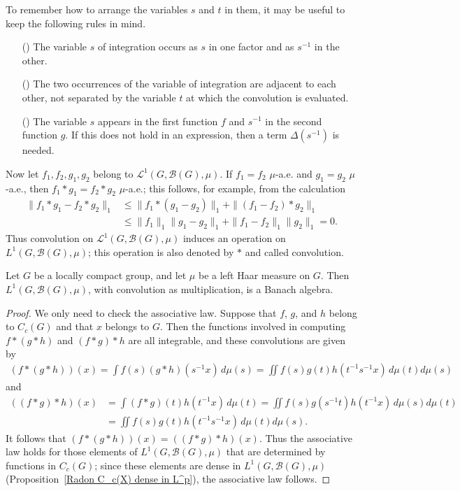 To remember how to arrange the variables $s$ and $t$ in them, it may be useful to keep the following rules in mind.
\begin{itemize}
\item[(\rmnum{1})] The variable $s$ of integration occurs as $s$ in one factor and as $s^{-1}$ in the other.
\item[(\rmnum{2})] The two occurrences of the variable of integration are adjacent to each other, not separated by the variable $t$ at which the convolution is evaluated.
\item[(\rmnum{3})] The variable $s$ appears in the first function $f$ and $s^{-1}$ in the second function $g$. If this does not hold in an expression, then a term $\Delta(s^{-1})$ is needed.
\end{itemize}
Now let $f_1,f_2,g_1,g_2$ belong to $\mathcal{L}^1(G,\mathcal{B}(G),\mu)$. If $f_1=f_2$ $\mu$-a.e. and $g_1=g_2$ $\mu$-a.e., then $f_1\ast g_1=f_2\ast g_2$ $\mu$-a.e.; this follows, for example, from the calculation
\begin{align*}
\|f_1\ast g_1-f_2\ast g_2\|_1&\leq\|f_1\ast(g_1-g_2)\|_1+\|(f_1-f_2)\ast g_2\|_1\\
&\leq\|f_1\|_1\|g_1-g_2\|_1+\|f_1-f_2\|_1\|g_2\|_1=0.
\end{align*}
Thus convolution on $\mathcal{L}^1(G,\mathcal{B}(G),\mu)$ induces an operation on $L^1(G,\mathcal{B}(G),\mu)$; this operation is also denoted by $\ast$ and called convolution.
\begin{proposition}
Let $G$ be a locally compact group, and let $\mu$ be a left Haar measure on $G$. Then $L^1(G,\mathcal{B}(G),\mu)$, with convolution as multiplication, is a Banach algebra.
\end{proposition}
\begin{proof}
We only need to check the associative law. Suppose that $f$, $g$, and $h$ belong to $C_c(G)$ and that $x$ belongs to $G$. Then the functions involved in computing $f\ast(g\ast h)$ and $(f\ast g)\ast h$ are all integrable, and these convolutions are given by
\begin{align*}
(f\ast(g\ast h))(x)=\int f(s)(g\ast h)(s^{-1}x)\,d\mu(s)=\iint f(s)g(t)h(t^{-1}s^{-1}x)\,d\mu(t)d\mu(s)
\end{align*}
and
\begin{align*}
((f\ast g)\ast h)(x)&=\int (f\ast g)(t)h(t^{-1}x)\,d\mu(t)=\iint f(s)g(s^{-1}t)h(t^{-1}x)\,d\mu(s)d\mu(t)\\
&=\iint f(s)g(t)h(t^{-1}s^{-1}x)\,d\mu(t)d\mu(s).
\end{align*}
It follows that $(f\ast (g\ast h))(x)=((f\ast g)\ast h)(x)$. Thus the associative law holds for those elements of $L^1(G,\mathcal{B}(G),\mu)$ that are determined by functions in $C_c(G)$; since these elements are dense in $L^1(G,\mathcal{B}(G),\mu)$ (Proposition~\ref{Radon C_c(X) dense in L^p}), the associative law follows.
\end{proof}
